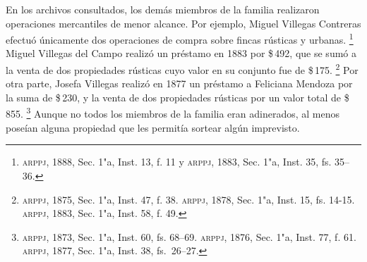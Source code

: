 \documentclass[14pt,twoside,final]{extbook} %
\let\oldfootnote\footnote
\renewcommand\footnote[1]{%
\oldfootnote{\hspace{1mm}#1}}
\begin{document}
En los archivos consultados, los demás miembros de la familia realizaron operaciones mercantiles de menor alcance. Por ejemplo, Miguel Villegas Contreras efectuó únicamente dos operaciones de compra sobre fincas rústicas y urbanas.\footnote{\textsc{arppj}, 1888, Sec. 1"a, Inst. 13, f. 11 y \textsc{arppj}, 1883, Sec. 1"a, Inst. 35, fs. 35--36.} Miguel Villegas del Campo realizó un préstamo en 1883 por \$\,492, que se sumó a la venta de dos propiedades rústicas cuyo valor en su conjunto fue de \$\,175.\footnote{\textsc{arppj}, 1875, Sec. 1"a, Inst. 47, f. 38. \textsc{arppj}, 1878, Sec. 1"a, Inst. 15, fs. 14-15. \textsc{arppj}, 1883, Sec. 1"a, Inst. 58, f. 49.} Por otra parte, Josefa Villegas realizó en 1877 un préstamo a Feliciana Mendoza por la suma de \$\,230, y la venta de dos propiedades rústicas por un valor total de \$\,855.\footnote{\textsc{arppj}, 1873, Sec. 1"a, Inst. 60, fs. 68--69. \textsc{arppj}, 1876, Sec. 1"a, Inst. 77, f. 61. \textsc{arppj}, 1877, Sec. 1"a, Inst. 38, fs.~26--27.} Aunque no todos los miembros de la familia eran adinerados, al menos poseían alguna propiedad que les permitía sortear algún imprevisto.
\end{document}
